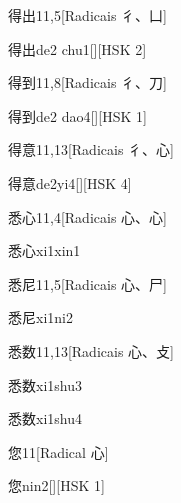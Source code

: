 \begin{entry}{得出}{11,5}[Radicais ⼻、⼐]
  \begin{phonetics}{得出}{de2 chu1}[][HSK 2]
  \end{phonetics}
\end{entry}

\begin{entry}{得到}{11,8}[Radicais ⼻、⼑]
  \begin{phonetics}{得到}{de2 dao4}[][HSK 1]
  \end{phonetics}
\end{entry}

\begin{entry}{得意}{11,13}[Radicais ⼻、⼼]
  \begin{phonetics}{得意}{de2yi4}[][HSK 4]
  \end{phonetics}
\end{entry}

\begin{entry}{悉心}{11,4}[Radicais ⼼、⼼]
  \begin{phonetics}{悉心}{xi1xin1}
  \end{phonetics}
\end{entry}

\begin{entry}{悉尼}{11,5}[Radicais ⼼、⼫]
  \begin{phonetics}{悉尼}{xi1ni2}
  \end{phonetics}
\end{entry}

\begin{entry}{悉数}{11,13}[Radicais ⼼、⽁]
  \begin{phonetics}{悉数}{xi1shu3}
  \end{phonetics}
  \begin{phonetics}{悉数}{xi1shu4}
  \end{phonetics}
\end{entry}

\begin{entry}{您}{11}[Radical ⼼]
  \begin{phonetics}{您}{nin2}[][HSK 1]
  \end{phonetics}
\end{entry}

